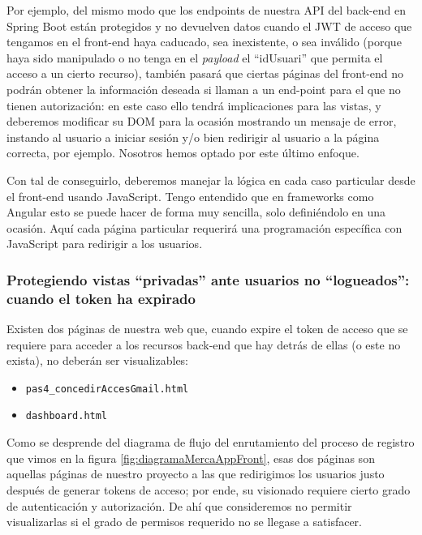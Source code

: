 \documentclass[a4paper,12pt]{report}
\begin{document}
	Por ejemplo, del mismo modo que los endpoints de nuestra API del back-end en Spring Boot están protegidos y no devuelven datos cuando el JWT de acceso que tengamos en el front-end haya caducado, sea inexistente, o sea inválido (porque haya sido manipulado o no tenga en el \textit{payload} el ``idUsuari'' que permita el acceso a un cierto recurso), también pasará que ciertas páginas del front-end no podrán obtener la información deseada si llaman a un end-point para el que no tienen autorización: en este caso ello tendrá implicaciones para las vistas, y deberemos modificar su DOM para la ocasión mostrando un mensaje de error, instando al usuario a iniciar sesión y/o bien redirigir al usuario a la página correcta, por ejemplo. Nosotros hemos optado por este último enfoque.
	
	Con tal de conseguirlo, deberemos manejar la lógica en cada caso particular desde el front-end usando JavaScript. Tengo entendido que en frameworks como Angular esto se puede hacer de forma muy sencilla, solo definiéndolo en una ocasión. Aquí cada página particular requerirá una programación específica con JavaScript para redirigir a los usuarios.
	
	\subsubsection{Protegiendo vistas ``privadas'' ante usuarios no ``logueados'': cuando el token ha expirado}
	
	Existen dos páginas de nuestra web que, cuando expire el token de acceso que se requiere para acceder a los recursos back-end que hay detrás de ellas (o este no exista), no deberán ser visualizables:
	
	\vspace{0em}
	\begin{itemize}
		\setlength{\itemsep}{-.5em}
		\item \texttt{pas4\_concedirAccesGmail.html}
		\item \texttt{dashboard.html}
	\end{itemize}
	
	Como se desprende del diagrama de flujo del enrutamiento del proceso de registro que vimos en la figura \ref{fig:diagramaMercaAppFront}, esas dos páginas son aquellas páginas de nuestro proyecto a las que redirigimos los usuarios justo después de generar tokens de acceso; por ende, su visionado requiere cierto grado de autenticación y autorización. De ahí que consideremos no permitir visualizarlas si el grado de permisos requerido no se llegase a satisfacer.
	
\end{document}
